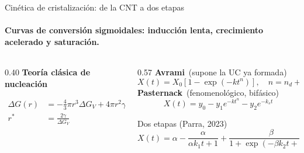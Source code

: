 \documentclass[aspectratio=169,11pt]{beamer}
\begin{document}
\begin{frame}{Cinética de cristalización: de la CNT a dos etapas}
  \framesubtitle{Curvas de conversión sigmoidales: inducción lenta, crecimiento acelerado y saturación.}
  \begin{columns}[c,onlytextwidth]
    \begin{column}{0.40\textwidth}
      \centering
      {\color{azul}\bfseries\small Teoría clásica de nucleación}\\[0.2em]
      \small
      \begin{align}
        \Delta G(r) &= -\tfrac{4}{3}\pi r^{3}\Delta G_V + 4\pi r^{2}\gamma \tag{1}\\
        r^{*} &= \frac{2\gamma}{\Delta G_V} \tag{2}
      \end{align}
    \end{column}
    \begin{column}{0.57\textwidth}
      \small
      {\color{azul}\bfseries Avrami}\ {\footnotesize (supone la UC ya formada)}
      \begin{equation}
        X(t) = X_0\left[1-\exp\!\left(-kt^{n}\right)\right],\quad n=n_d+n_N \tag{3}
      \end{equation}
      {\color{azul}\bfseries Pasternack}\ {\footnotesize (fenomenológico, bifásico)}
      \begin{equation}
        X(t) = y_0 - y_1 e^{-kt^{n}} - y_2 e^{-k_s t} \tag{4}
      \end{equation}
      \vspace{-0.6em}
      \begin{block}{Dos etapas (Parra, 2023)}
        \vspace{-0.4em}
        \begin{equation}
          X(t) = \alpha - \frac{\alpha}{\alpha k_1 t + 1} + \frac{\beta}{1+\exp\!\left(-\beta k_2 t + D\right)} \tag{5}
        \end{equation}
      \end{block}
    \end{column}
  \end{columns}
\end{frame}
\end{document}
